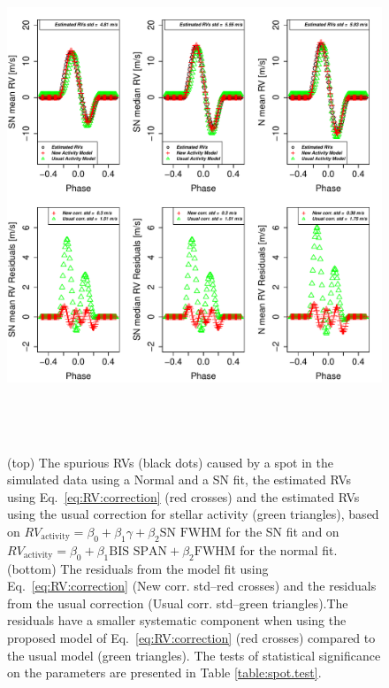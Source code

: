 \documentclass{aa}
\begin{document}
\begin{figure}[htbp]
\begin{center}
\includegraphics[height = 6in]{Spot_NEW_CORRECTION_[3]CorrectionActivity_RadialVelocity_vs_time.pdf} 
   \caption{(top) The spurious RVs (black dots) caused by a spot in the simulated data using a Normal and a SN fit, the estimated RVs using Eq.~\ref{eq:RV:correction} (red crosses) and the estimated RVs using the usual correction for stellar activity (green triangles), based on $RV_{\text{activity}}=\beta_0+\beta_1 \gamma + \beta_2 \text{SN FWHM}$ for the SN fit and on $RV_{\text{activity}}=\beta_0+\beta_1 \text{BIS SPAN} + \beta_2 \text{FWHM}$ for the normal fit.
 (bottom) The residuals from the model fit using Eq.~\ref{eq:RV:correction} (New corr. std--red crosses) and the residuals from the usual correction (Usual corr. std--green triangles).The residuals have a smaller systematic component when using the proposed model of 
  Eq.~\ref{eq:RV:correction} (red crosses) compared to the usual model (green triangles).
The tests of statistical significance on the parameters are presented in Table \ref{table:spot.test}.
}
    \label{fig:spot.correction}
\end{center}
\end{figure}
\end{document}
